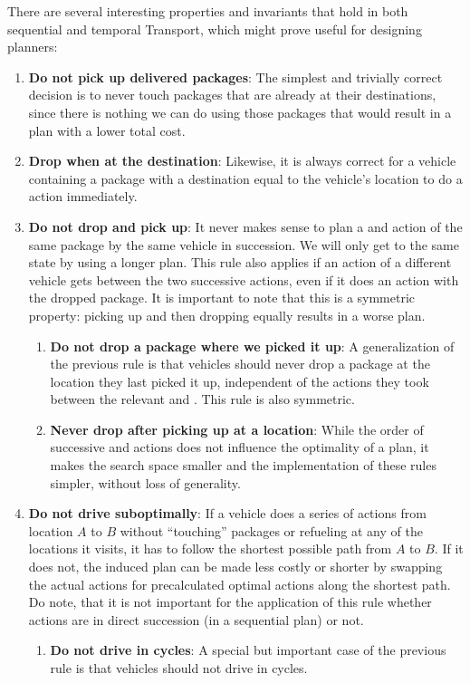 There are several interesting properties and invariants that hold in both sequential and temporal Transport, which might prove useful for designing planners:
\begin{enumerate}
\item \textbf{Do not pick up delivered packages}: The simplest and trivially correct decision is to never touch packages that are already at their destinations, since there is nothing
we can do using those packages that would result in a plan with a lower total cost.

\item \textbf{Drop when at the destination}: Likewise, it is
always correct for a vehicle containing a package with a destination equal
to the vehicle's location to do a \drop{} action immediately.

\item \textbf{Do not drop and pick up}: It never makes sense to plan a \drop{} and \pickup{}
action of
the same package by the same vehicle in succession. We will only get to the same state
by using a longer plan. This rule also applies if an action of a different vehicle
gets between the two successive actions, even if it does an action with the
dropped package.
It is important to note that this is a symmetric property: picking up
and then dropping equally results in a worse plan.
\begin{enumerate}
\item \textbf{Do not drop a package where we picked it up}: A generalization
of the previous rule is that vehicles should never drop a package
at the location they last picked it up, independent of the actions they took
between the relevant \pickup{} and \drop{}. This rule is also symmetric.

\item \textbf{Never drop after picking up at a location}:
While the order of successive \pickup{} and \drop{} actions does not
influence the optimality of a plan, it makes the search space smaller and the implementation of these rules simpler,
without loss of generality.
\end{enumerate}

\item \textbf{Do not drive suboptimally}: If a vehicle does a series of
\drive{} actions from location $A$ to $B$ without ``touching'' packages
or refueling at any of the locations it visits,
it has to follow the shortest possible path from $A$ to $B$. If it does not,
the induced plan can be made less costly or shorter by swapping the actual \drive{} actions
for precalculated optimal \drive{} actions along the shortest path.
Do note, that it is not important for the application of this rule whether actions are in direct succession (in a sequential plan) or not.
\begin{enumerate}
\item \textbf{Do not drive in cycles}: A special but important case of the previous rule is that vehicles should not drive in cycles.
\end{enumerate}


\end{enumerate}
